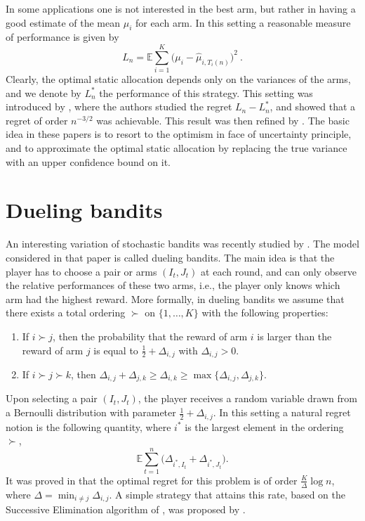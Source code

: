 \documentclass[11pt]{hackednow}
\newcommand{\E}{\mathbb{E}}
\begin{document}
In some applications one is not interested in the best arm, but rather in having a good estimate of the mean $\mu_i$ for each arm. In this setting a reasonable measure of performance is given by
$$L_n = \E \sum_{i=1}^K \bigl(\mu_i - \hat{\mu}_{i,T_i(n)}\bigr)^2~.$$
Clearly, the optimal static allocation depends only on the variances of the arms, and we denote by $L_n^*$ the performance of this strategy. 
This setting was introduced by \cite{AGS08}, where the authors studied the regret $L_n - L_n^*$, and showed that a regret of order $n^{-3/2}$ was achievable. This result was then refined by \cite{CLGMA11, CM11}. The basic idea in these papers is to resort to the optimism in face of uncertainty principle, and to approximate the optimal static allocation by replacing the true variance with an upper confidence bound on it.


\section{Dueling bandits} \label{sec:dueling}
An interesting variation of stochastic bandits was recently studied by \cite{YBKJ09}. The model considered in that paper is called dueling bandits. The main idea is that the player has to choose a pair or arms $(I_t, J_t)$ at each round, and can only observe the relative performances of these two arms, i.e., the player only knows which arm had the highest reward. More formally, in dueling bandits we assume that there exists a total ordering $\succ$ on $\{1,\hdots,K\}$ with the following properties:
\begin{enumerate}
\item If $i \succ j$, then the probability that the reward of arm $i$ is larger than the reward of arm $j$ is equal to $\frac12 + \Delta_{i,j}$ with $\Delta_{i,j} >0$.
\item If $i \succ j \succ k$, then $\Delta_{i,j} + \Delta_{j,k} \geq \Delta_{i,k} \geq \max\bigl\{\Delta_{i,j}, \Delta_{j,k}\bigr\}$.
\end{enumerate}
Upon selecting a pair $(I_t, J_t)$, the player receives a random variable drawn from a Bernoulli distribution with parameter $\frac12+\Delta_{i,j}$. In this setting a natural regret notion is the following quantity, where $i^*$ is the largest element in the ordering $\succ$,
$$\E \sum_{t=1}^n \bigl(\Delta_{i^*, I_t} + \Delta_{i^*, J_t} \bigr) .$$
It was proved in \cite{YBKJ09} that the optimal regret for this problem is of order $\frac{K}{\Delta} \log n$, where $\Delta = \min_{i \neq j} \Delta_{i,j}$. A simple strategy that attains this rate, based on the Successive Elimination algorithm of \cite{EMM02}, was proposed by \cite{YJ11}.
\end{document}
